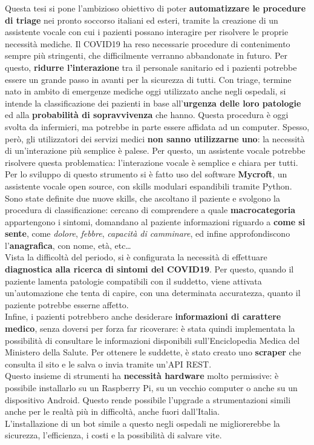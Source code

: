 \documentclass[trieste,corpo=11pt,numerazioneromana]{toptesi}
\begin{document}
\sommario
Questa tesi si pone l'ambizioso obiettivo di poter \textbf{automatizzare le procedure di triage} nei pronto soccorso italiani ed esteri, tramite la creazione di un assistente vocale con cui i pazienti possano interagire per risolvere le proprie necessità mediche. Il COVID19 ha reso necessarie procedure di contenimento sempre più stringenti, che difficilmente verranno abbandonate in futuro. Per questo, \textbf{ridurre l'interazione} tra il personale sanitario ed i pazienti potrebbe essere un grande passo in avanti per la sicurezza di tutti. Con triage, termine nato in ambito di emergenze mediche oggi utilizzato anche negli ospedali, si intende la classificazione dei pazienti in base all'\textbf{urgenza delle loro patologie} ed alla \textbf{probabilità di sopravvivenza} che hanno. Questa procedura è oggi svolta da infermieri, ma potrebbe in parte essere affidata ad un computer. Spesso, però, gli utilizzatori dei servizi medici \textbf{non sanno utilizzarne uno}: la necessità di un'interazione più semplice è palese. Per questo, un assistente vocale potrebbe risolvere questa problematica: l'interazione vocale è semplice e chiara per tutti.\\
Per lo sviluppo di questo strumento si è fatto uso del software \textbf{Mycroft}, un assistente vocale open source, con skills modulari espandibili tramite Python. Sono state definite due nuove skills, che ascoltano il paziente e svolgono la procedura di classificazione: cercano di comprendere a quale \textbf{macrocategoria} appartengono i sintomi, domandano al paziente informazioni riguardo a \textbf{come si sente}, come \textit{dolore}, \textit{febbre}, \textit{capacità di camminare}, ed infine approfondiscono l'\textbf{anagrafica}, con nome, età, etc\dots\\
Vista la difficoltà del periodo, si è configurata la necessità di effettuare \textbf{diagnostica alla ricerca di sintomi del COVID19}. Per questo, quando il paziente lamenta patologie compatibili con il suddetto, viene attivata un'automazione che tenta di capire, con una determinata accuratezza, quanto il paziente potrebbe esserne affetto.\\
Infine, i pazienti potrebbero anche desiderare \textbf{informazioni di carattere medico}, senza doversi per forza far ricoverare: è stata quindi implementata la possibilità di consultare le informazioni disponibili sull'Enciclopedia Medica del Ministero della Salute. Per ottenere le suddette, è stato creato uno \textbf{scraper} che consulta il sito e le salva o invia tramite un'API REST.\\
Questo insieme di strumenti ha \textbf{necessità hardware} molto permissive: è possibile installarlo su un Raspberry Pi, su un vecchio computer o anche su un dispositivo Android. Questo rende possibile l'upgrade a strumentazioni simili anche per le realtà più in difficoltà, anche fuori dall'Italia.\\
L'installazione di un bot simile a questo negli ospedali ne migliorerebbe la sicurezza, l'efficienza, i costi e la possibilità di salvare vite.
\end{document}

